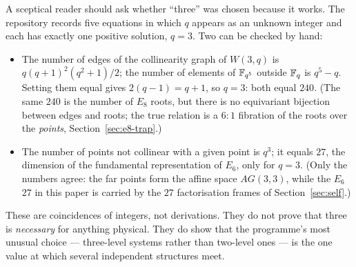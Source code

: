 A sceptical reader should ask whether ``three'' was chosen because it works. The
repository records five equations in which $q$ appears as an unknown integer and each has
exactly one positive solution, $q=3$. Two can be checked by hand:
\begin{itemize}
\item The number of edges of the collinearity graph of $W(3,q)$ is
      $q(q+1)^2(q^2+1)/2$; the number of elements of $\mathbb{F}_{q^5}$ outside $\mathbb{F}_q$ is $q^5-q$.
      Setting them equal gives $2(q-1)=q+1$, so $q=3$: both equal $240$. (The same $240$ is
      the number of $E_8$ roots, but there is no equivariant bijection between edges and roots;
      the true relation is a $6{:}1$ fibration of the roots over the \emph{points},
      Section~\ref{sec:e8-trap}.)
\item The number of points not collinear with a given point is $q^3$; it equals $27$,
      the dimension of the fundamental representation of $E_6$, only for $q=3$. (Only the
      numbers agree: the far points form the affine space $AG(3,3)$, while the $E_6$ $27$ in this
      paper is carried by the $27$ factorisation frames of Section~\ref{sec:self}.)
\end{itemize}

\begin{boundary}
These are coincidences of integers, not derivations. They do not prove that three is
\emph{necessary} for anything physical. They do show that the programme's most unusual
choice --- three-level systems rather than two-level ones --- is the one value at which
several independent structures meet. \tierB
\end{boundary}
